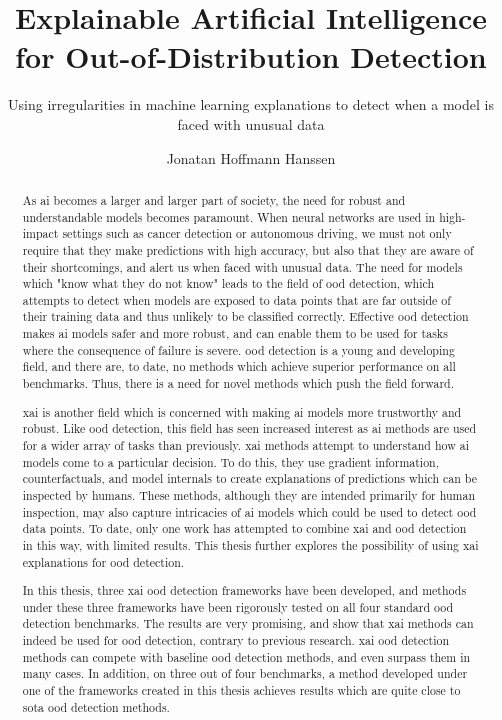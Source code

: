 \documentclass[UKenglish]{uiomasterthesis} %
\title{Explainable Artificial Intelligence for Out-of-Distribution Detection}
\subtitle{Using irregularities in machine learning explanations to detect when a model is faced with unusual data}
\author{Jonatan Hoffmann Hanssen}
\theoremstyle{definition}
\begin{document}
\uiomasterfp[dept={Department of Informatics},
program={Robotics and Intelligent Systems},
supervisors={Hugo Lewi Hammer \and Kyrre Harald Glette \and Michael Riegler}, long]

\frontmatter{}
\begin{abstract}
    As \ac{ai} becomes a larger and larger part of society, the need for robust and understandable models becomes paramount. When neural networks are used in high-impact settings such as cancer detection or autonomous driving, we must not only require that they make predictions with high accuracy, but also that they are aware of their shortcomings, and alert us when faced with unusual data. The need for models which "know what they do not know" leads to the field of \ac{ood} detection, which attempts to detect when models are exposed to data points that are far outside of their training data and thus unlikely to be classified correctly. Effective \ac{ood} detection makes \ac{ai} models safer and more robust, and can enable them to be used for tasks where the consequence of failure is severe. \ac{ood} detection is a young and developing field, and there are, to date, no methods which achieve superior performance on all benchmarks. Thus, there is a need for novel methods which push the field forward.

    \ac{xai} is another field which is concerned with making \ac{ai} models more trustworthy and robust. Like \ac{ood} detection, this field has seen increased interest as \ac{ai} methods are used for a wider array of tasks than previously. \ac{xai} methods attempt to understand how \ac{ai} models come to a particular decision. To do this, they use gradient information, counterfactuals, and model internals to create explanations of predictions which can be inspected by humans. These methods, although they are intended primarily for human inspection, may also capture intricacies of \ac{ai} models which could be used to detect \ac{ood} data points. To date, only one work has attempted to combine \ac{xai} and \ac{ood} detection in this way, with limited results. This thesis further explores the possibility of using \ac{xai} explanations for \ac{ood} detection.

    In this thesis, three \ac{xai} \ac{ood} detection frameworks have been developed, and methods under these three frameworks have been rigorously tested on all four standard \ac{ood} detection benchmarks. The results are very promising, and show that \ac{xai} methods can indeed be used for \ac{ood} detection, contrary to previous research. \ac{xai} \ac{ood} detection methods can compete with baseline \ac{ood} detection methods, and even surpass them in many cases. In addition, on three out of four benchmarks, a method developed under one of the frameworks created in this thesis achieves results which are quite close to \ac{sota} \ac{ood} detection methods.
\end{abstract}
\end{document}

